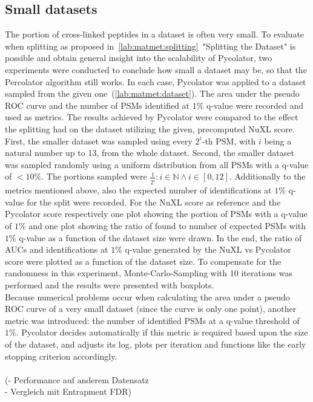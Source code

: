 \subsection{Small datasets}
\label{lab:matmet:small_datasets}
The portion of cross-linked peptides in a dataset is often very small. To evaluate when splitting as proposed in~\ref{lab:matmet:splitting}~"Splitting the Dataset" is possible and obtain general insight into the scalability of Pycolator, two experiments were conducted to conclude how small a dataset may be, so that the Percolator algorithm still works. In each case, Pycolator was applied to a dataset sampled from the given one~(\ref{lab:matmet:dataset}). The area under the pseudo ROC curve and the number of PSMs identified at $1\%$ q-value were recorded and used as metrics. The results achieved by Pycolator were compared to the effect the splitting had on the dataset utilizing the given, precomputed NuXL score.\\
First, the smaller dataset was sampled using every $2^i$-th PSM, with $i$ being a natural number up to 13, from the whole dataset. Second, the smaller dataset was sampled randomly using a uniform distribution from all PSMs with a q-value of $<10\%$. The portions sampled were $\frac{1}{2^i} : i\in\mathbb{N} \land i\in[0,12]$. Additionally to the metrics mentioned above, also the expected number of identifications at $1\%$ q-value for the split were recorded. For the NuXL score as reference and the Pycolator score respectively one plot showing the portion of PSMs with a q-value of $1\%$ and one plot showing the ratio of found to number of expected PSMs with $1\%$ q-value as a function of the dataset size were drawn. In the end, the ratio of AUCs and identifications at $1\%$ q-value generated by the NuXL vs Pycolator score were plotted as a function of the dataset size. To compensate for the randomness in this experiment, Monte-Carlo-Sampling with 10 iterations was performed and the results were presented with boxplots. \\
Because numerical problems occur when calculating the area under a pseudo ROC curve of a very small dataset (since the curve is only one point), another metric was introduced: the number of identified PSMs at a q-value threshold of $1\%$. Pycolator decides automatically if this metric is required based upon the size of the dataset, and adjusts its log, plots per iteration and functions like the early stopping criterion accordingly.\\\\
(- Performance auf anderem Datensatz\\
- Vergleich mit Entrapment FDR)